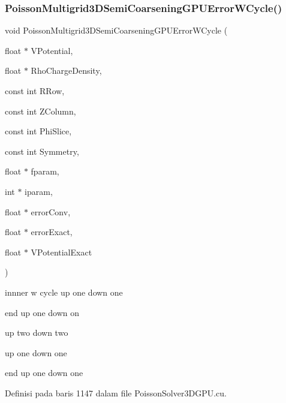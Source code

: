 \subsubsection{\texorpdfstring{Poisson\+Multigrid3\+D\+Semi\+Coarsening\+G\+P\+U\+Error\+W\+Cycle()}{PoissonMultigrid3DSemiCoarseningGPUErrorWCycle()}}
{\footnotesize\ttfamily void Poisson\+Multigrid3\+D\+Semi\+Coarsening\+G\+P\+U\+Error\+W\+Cycle (\begin{DoxyParamCaption}\item[{float $\ast$}]{V\+Potential,  }\item[{float $\ast$}]{Rho\+Charge\+Density,  }\item[{const int}]{R\+Row,  }\item[{const int}]{Z\+Column,  }\item[{const int}]{Phi\+Slice,  }\item[{const int}]{Symmetry,  }\item[{float $\ast$}]{fparam,  }\item[{int $\ast$}]{iparam,  }\item[{float $\ast$}]{error\+Conv,  }\item[{float $\ast$}]{error\+Exact,  }\item[{float $\ast$}]{V\+Potential\+Exact }\end{DoxyParamCaption})}

innner w cycle up one down one

end up one down on

up two down two

up one down one

end up one down one 

Definisi pada baris 1147 dalam file Poisson\+Solver3\+D\+G\+P\+U.\+cu.


